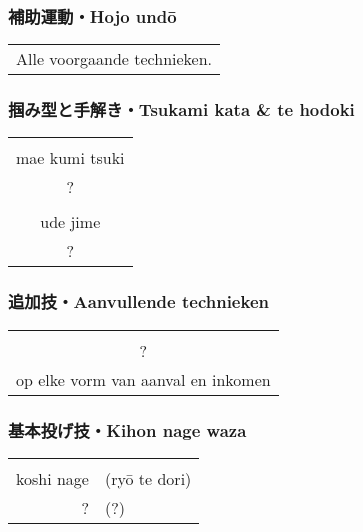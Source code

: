 \subsubsection{補助運動・Hojo und\={o}}
\begin{table}[H]
\begin{center}
\begin{tabular}{c}
    Alle voorgaande technieken.
\end{tabular}
\end{center}
\label{kyuu_1_hojo_undou}
\end{table}

\subsubsection{掴み型と手解き・Tsukami kata \& te hodoki}
\begin{table}[H]
\begin{center}
\begin{tabular}{c}
    \ruby{}{}\ruby{}{}\\
    mae kumi tsuki\\
    ?\\
    \hline
    \ruby{}{}\\
    ude jime\\
    ?
\end{tabular}
\end{center}
\label{kyuu_1_te_hodoki}
\end{table}

\subsubsection{追加技・Aanvullende technieken}
\begin{table}[H]
\begin{center}
\begin{tabular}{c}
    \ruby{}{}\\
    ?\\
    op elke vorm van aanval en inkomen
\end{tabular}
\end{center}
\label{kyuu_1_additional}
\end{table}

\subsubsection{基本投げ技・Kihon nage waza}
\begin{table}[H]
\begin{center}
\begin{tabular}{rl}
    \ruby{}{}\ruby{}{} & \\
    koshi nage & (ry\={o} te dori)\\
    ? & (?)
\end{tabular}
\end{center}
\label{kyuu_1_kihon_nage_waza}
\end{table}

